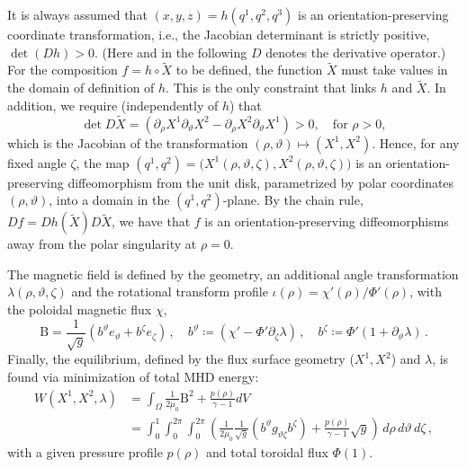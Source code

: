 \documentclass[12pt]{iopart}
\newcommand\hladdedrev[1]{#1} %
\newcommand\hlchanged[1]{#1} %
\newcommand{\thet}{\vartheta}
\newcommand{\Jac}{\sqrt{g}}
\begin{document}
\hladdedrev{It is always assumed that $(x,y,z) = h(q^1,q^2,q^3)$ is an orientation-preserving coordinate transformation, i.e., the Jacobian determinant is strictly positive, $\det (Dh) > 0$. (Here and in the following $D$ denotes the derivative operator.) For the composition $f = h \circ \tilde{X}$ to be defined, the function $\tilde{X}$ must take values in the domain of definition of $h$. This is the only constraint that links $h$ and \hlchanged{$\tilde{X}$}. In addition, we require (independently of $h$) that 
\begin{equation*}
    \det D\tilde{X} = \left(\partial_\rho X^1 \partial_\thet X^2 - \partial_\rho X^2 \partial_\thet X^1\right) > 0, \quad \text{for $\rho > 0$},
\end{equation*}
which is the Jacobian of the transformation $(\rho,\thet) \mapsto (X^1,X^2)$. 
Hence, for any fixed angle $\zeta$, the map $(q^1, q^2) = \big(X^1(\rho,\thet,\zeta), X^2(\rho,\thet,\zeta)\big)$ is an orientation-preserving diffeomorphism from the unit disk, parametrized by polar coordinates $(\rho,\thet)$, into a domain in the $(q^1,q^2)$-plane. By the chain rule, $Df = Dh(\tilde{X}) D\tilde{X}$, we have that $f$ is an orientation-preserving diffeomorphisms away from the polar singularity at $\rho=0$. 
}%

The magnetic field is defined by the geometry, an additional angle transformation $\lambda(\rho,\thet,\zeta)$ and the rotational transform profile  $\iota(\rho)=\chi'(\rho)/\Phi'(\rho)$,  with the poloidal magnetic flux $\chi$,  
\begin{equation}
    \mathrm{B}=\frac{1}{\Jac}(b^\thet e_\thet + b^\zeta e_\zeta)\,, \quad b^\thet\coloneqq(\chi'-\Phi' \partial_\zeta\lambda) \,,\quad
     b^\zeta \coloneqq\Phi'(1+\partial_\thet\lambda)\,. 
\end{equation}
Finally, the equilibrium, defined by the flux surface geometry ($X^1,X^2$) and $\lambda$, is found via minimization of total MHD energy:
\begin{equation}
    \begin{aligned}
        W(X^1,X^2,\lambda) &=\int_\Omega \frac{1}{2\mu_0}\mathrm{B}^2 + \frac{p(\rho)}{\gamma-1} dV \\
        &= \int_0^1 \int_0^{2\pi} \int_0^{2\pi} \left(\frac{1}{2\mu_0}\frac{1}{\Jac}\left(b^\thet g_{\thet\zeta}b^\zeta\right)  +\frac{p(\rho)}{\gamma-1} \Jac \right)\,d\rho\, d\thet\, d\zeta \,,
    \end{aligned} \label{eq:energy}
\end{equation}
with a given pressure profile $p(\rho)$ and total toroidal flux $\Phi(1)$. 
\end{document}

